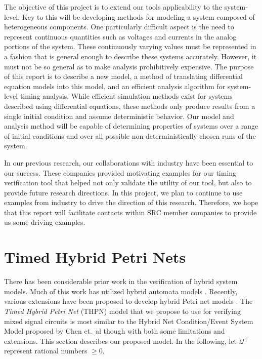 \documentclass[11pt,times]{article}
\begin{document}
The objective of this project is to extend our tools applicability to 
the system-level.  Key to this will be developing methods for modeling
a system composed of heterogeneous components.  One particularly difficult
aspect is the need to represent continuous quantities such as voltages and
currents in the analog portions of the system.  These continuously varying
values must be represented in a fashion that is general enough to describe 
these systems accurately.  However, it must not be so general as to make 
analysis prohibitively expensive.  The purpose of this report is to describe 
a new model, a method of translating differential equation models into this
model, and an efficient analysis algorithm for system-level timing analysis.
While efficient simulation methods exist for systems described using 
differential equations, these methods only produce results from a single
initial condition and assume deterministic behavior.  Our model and analysis
method will be capable of determining properties of systems over a range
of initial conditions and over all possible non-deterministically chosen
runs of the system. 

In our previous research, our collaborations with industry have been essential 
to our success.  These companies provided motivating examples for our timing 
verification tool that helped not only validate the utility of our tool, but 
also to provide future research directions.  In this project, we plan to 
continue to use examples from industry to drive the direction of this research.
Therefore, we hope that this report will facilitate contacts within SRC 
member companies to provide us some driving examples.

\section{Timed Hybrid Petri Nets}

There has been considerable prior work in the verification of hybrid system
models.  Much of this work has utilized hybrid automata models 
\cite{alur95algorithmic, alur92hybrid}.  Recently, various extensions have
been proposed to develop hybrid Petri net models 
\cite{Balduzzi2001,Chen2001,David2001,Tuffin2001}.  
The {\em Timed Hybrid Petri Net} (THPN) model that we propose to use for
verifying mixed signal circuits is most similar to the Hybrid Net 
Condition/Event System Model proposed by Chen et.~al \cite{Chen2001} 
though with both some limitations and extensions.  This section describes our 
proposed model.  In the following, let $\mathcal{Q}^+$ represent rational 
numbers $\geq 0$.
\end{document}
